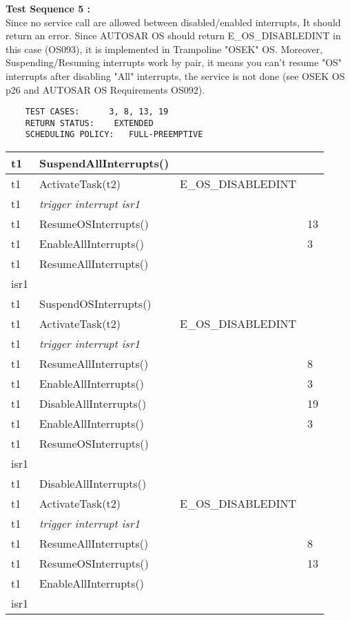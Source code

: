 \documentclass[10pt]{article}
\newlength{\Li}\settowidth{\Li}{Running}
\newlength{\Lii}\setlength{\Lii}{7cm}
\newlength{\Liiii}\setlength{\Liiii}{0.9cm}
\newlength{\Liii}\setlength{\Liii}{\textwidth} \addtolength{\Liii}{-\Li} \addtolength{\Liii}{-\Lii} \addtolength{\Liii}{-\Liiii}
\begin{document}
	\textbf{Test Sequence 5 :}\\
	Since no service call are allowed between disabled/enabled interrupts, It should return an error. Since AUTOSAR OS should return E\_OS\_DISABLEDINT in this case (OS093), it is implemented in Trampoline "OSEK" OS. Moreover, Suspending/Resuming interrupts work by pair, it means you can't resume "OS" interrupts after disabling "All" interrupts, the service is not done (see OSEK OS p26 and AUTOSAR OS Requirements OS092).
	\begin{lstlisting}
	TEST CASES:		 3, 8, 13, 19
	RETURN STATUS:	  EXTENDED
	SCHEDULING POLICY:   FULL-PREEMPTIVE
	\end{lstlisting}
	
	
	\begin{supertabular}{|p{\Li}|p{\Lii}|p{\Liii}|p{\Liiii}|} \hline 
	t1	& SuspendAllInterrupts()							& 	 				& \\ \hline
	t1	& ActivateTask(t2)								& E\_OS\_DISABLEDINT	& \\ \hline
	t1	& \textit{trigger interrupt isr1}						& 					& \\ \hline
	t1	& ResumeOSInterrupts()							& 	 				& 13 \\ \hline
	t1	& EnableAllInterrupts()							& 	 				& 3 \\ \hline
	t1	& ResumeAllInterrupts()							& 	 				& \\ \hline
	isr1	& 											& 					& \\ \hline
	
	t1	& SuspendOSInterrupts()							& 	 				& \\ \hline
	t1	& ActivateTask(t2)								& E\_OS\_DISABLEDINT	& \\ \hline
	t1	& \textit{trigger interrupt isr1}						& 					& \\ \hline
	t1	& ResumeAllInterrupts()							& 	 				& 8 \\ \hline
	t1	& EnableAllInterrupts()							& 	 				& 3 \\ \hline
	t1	& DisableAllInterrupts()							& 	 				& 19 \\ \hline
	t1	& EnableAllInterrupts()							& 	 				& 3 \\ \hline
	t1	& ResumeOSInterrupts()							& 	 				& \\ \hline
	isr1	& 											& 					& \\ \hline
	
	t1	& DisableAllInterrupts()							& 	 				& \\ \hline
	t1	& ActivateTask(t2)								& E\_OS\_DISABLEDINT	& \\ \hline
	t1	& \textit{trigger interrupt isr1}						& 					& \\ \hline
	t1	& ResumeAllInterrupts()							& 	 				& 8 \\ \hline
	t1	& ResumeOSInterrupts()							& 	 				& 13 \\ \hline
	t1	& EnableAllInterrupts()							& 	 				& \\ \hline
	isr1	& 											& 					& \\ \hline
	

\end{supertabular}
\end{document}

